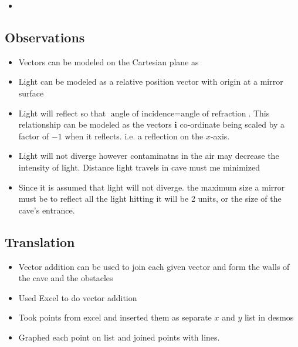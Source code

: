 \documentclass[11pt, letterpaper]{article}
\begin{document}
{\begin{itemize}
	\item 
\end{itemize}

\subsection{Observations}
\par
\begin{itemize}
\item Vectors can be modeled on the Cartesian plane as 

\item Light can be modeled as a relative position vector with origin at a mirror surface

\item Light will reflect so that $\textrm{angle  of incidence} = \textrm{angle of refraction}$. This relationship can be modeled as the vectors $\bm{i}$ co-ordinate being scaled by a factor of $-1$ when it reflects. i.e. a reflection on the $x$-axis.

\item Light will not diverge however contaminatns in the air may decrease the intensity of light. Distance light travels in cave must me minimized

\item  Since it is assumed that light will not diverge. the maximum size a mirror must be to reflect all the light hitting it will be 2 units, or the size of the cave's entrance.
\end{itemize}





\subsection{Translation}
\par 

\begin{itemize}
\item Vector addition can be used to join each given vector and form the walls of the cave and the obstacles

\item Used Excel to do vector addition

\item Took points from excel and inserted them as separate $x$ and $y$ list in desmos

\item Graphed each point on list and joined points with lines.
\end{itemize}


}
\end{document}

